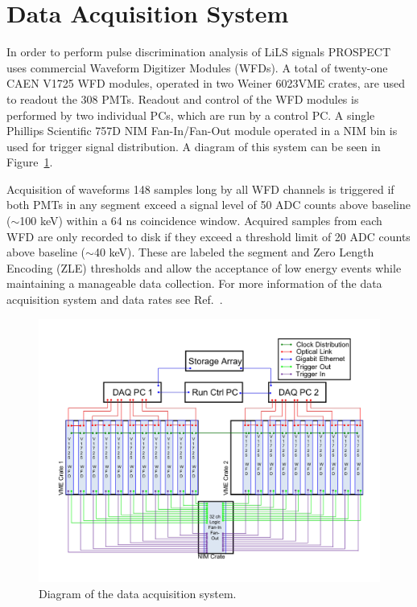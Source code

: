 \section{Data Acquisition System}

In order to perform pulse discrimination analysis of LiLS signals PROSPECT uses commercial Waveform Digitizer Modules (WFDs).
A total of twenty-one CAEN V1725 WFD modules, operated in two Weiner 6023VME crates, are used to readout the 308 PMTs. 
Readout and control of the WFD modules is performed by two individual PCs, which are run by a control PC. 
A single Phillips Scientific 757D NIM Fan-In/Fan-Out module operated in a NIM bin is used for trigger signal distribution.
A diagram of this system can be seen in Figure~\ref{fig:daq}.

Acquisition of waveforms 148 samples long by all WFD channels is triggered if both PMTs in any segment exceed a signal level of 50 ADC counts above baseline ($\sim$100 keV) within a 64 ns coincidence window.  
Acquired samples from each WFD are only recorded to disk if they exceed a threshold limit of 20 ADC counts above baseline ($\sim$40 keV). 
These are labeled the segment and Zero Length Encoding (ZLE) thresholds and allow the acceptance of low energy events while maintaining a manageable data collection. 
For more information of the data acquisition system and data rates see Ref.~\cite{LongNIM}.

\begin{figure}[h]
	\centering
	\includegraphics[width=0.7\linewidth]{tex/4-prospect-images/DAQ}
	\caption[DAQ schematic]{Diagram of the data acquisition system.}
	\label{fig:daq}
\end{figure}


